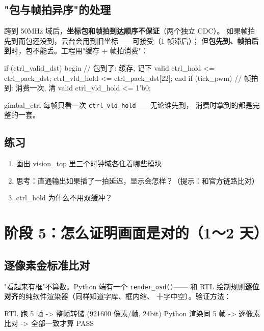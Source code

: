 \documentclass[11pt]{ctexart}
\newcommand{\code}[1]{\texttt{#1}}
\begin{document}
\subsection{"包与帧拍异序"的处理}

跨到 50MHz 域后，\textbf{坐标包和帧拍到达顺序不保证}（两个独立 CDC）。
如果帧拍先到而包还没到，云台会用到旧坐标——可接受（1 帧滞后）；
但\textbf{包先到、帧拍后到}时，包不能丢。工程用"缓存 + 帧拍消费"：

\begin{Verilog}
if (ctrl_valid_dst) begin      // 包到了: 缓存, 记下 valid
    ctrl_hold     <= ctrl_pack_dst;
    ctrl_vld_hold <= ctrl_pack_dst[22];
end
if (tick_pwm)                  // 帧拍到: 消费一次, 清 valid
    ctrl_vld_hold <= 1'b0;
\end{Verilog}

gimbal\_ctrl 每帧只看一次 \code{ctrl\_vld\_hold}——无论谁先到，
消费时拿到的都是完整的一套。

\subsection{练习}

\begin{enumerate}
  \item 画出 vision\_top 里三个时钟域各住着哪些模块
  \item 思考：直通输出如果插了一拍延迟，显示会怎样？（提示：和官方链路比对）
  \item ctrl\_hold 为什么不用双缓冲？
\end{enumerate}

\section{阶段 5：怎么证明画面是对的（1～2 天）}

\subsection{逐像素金标准比对}

"看起来有框"不算数。Python 端有一个 \code{render\_osd()}——
和 RTL 绘制规则\textbf{逐位对齐}的纯软件渲染器（同样知道字库、框内缩、
十字中空）。验证方法：

\begin{Verilog}
RTL 跑 5 帧 -> 整帧转储 (921600 像素/帧, 24bit)
Python 渲染同 5 帧 -> 逐像素比对 -> 全部一致才算 PASS
\end{Verilog}
\end{document}
